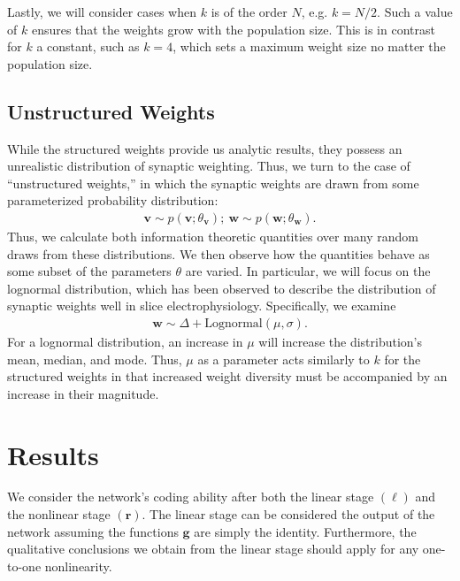 \documentclass[12pt]{article}
\begin{document}
Lastly, we will consider cases when $k$ is of the order $N$, e.g. $k = N/2$. Such a value of $k$ ensures that the weights grow with the population size. This is in contrast for $k$ a constant, such as $k=4$, which sets a maximum weight size no matter the population size. 
\subsection{Unstructured Weights}

While the structured weights provide us analytic results, they possess an unrealistic distribution of synaptic weighting. Thus, we turn to the case of ``unstructured weights,'' in which the synaptic weights are drawn from some parameterized probability distribution:
\begin{align}
\mathbf{v} \sim p(\mathbf{v}; \theta_{\mathbf{v}}); \ \mathbf{w} \sim p(\mathbf{w}; \theta_{\mathbf{w}}).
\end{align}
Thus, we  calculate both information theoretic quantities over many random draws from these distributions. We then observe how the quantities behave as some subset of the parameters $\theta$ are varied. In particular, we will focus on the lognormal distribution, which has been observed to describe the distribution of synaptic weights well in slice electrophysiology. Specifically, we examine 
\begin{align}
\mathbf{w}\sim \Delta + \text{Lognormal}(\mu, \sigma).
\end{align}
For a lognormal distribution, an increase in $\mu$ will increase the distribution's mean, median, and mode. Thus, $\mu$ as a parameter acts similarly to $k$ for the structured weights in that increased weight diversity must be accompanied by an increase in their magnitude.

\section{Results}
We consider the network's coding ability after both the linear stage $(\boldsymbol{\ell})$ and the nonlinear stage $(\mathbf{r})$. The linear stage can be considered the output of the network assuming the functions $\mathbf{g}$ are simply the identity. Furthermore, the qualitative conclusions we obtain from the linear stage should apply for any one-to-one nonlinearity. 
	
\end{document}
